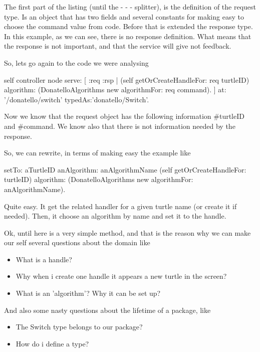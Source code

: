 \documentclass[a4paper,10pt,twoside]{book}
\begin{document}
			The first part of the listing (until the - - - splitter), is the definition of the request type. Is an object that has two fields and several constants for making easy to choose the command value from code. 
			Before that is extended the response type. In this example, as we can see, there is no response definition. What means that the response is not important, and that the service will give not feedback.
			
			So, lets go again to the code we were analysing
			
			
			\begin{code}
	self controller node serve: [ :req :rsp | 
		(self getOrCreateHandleFor: req turtleID)  algorithm: (DonatelloAlgorithms new algorithmFor: req command).		
	] at: '/donatello/switch' typedAs:'donatello/Switch'.

			\end{code}	
			
			Now we know that the request object has the following information \#turtleID and \#command. We know also that there is not information needed by the response. 
			
			So, we can rewrite, in terms of making easy the example like 
			
			\begin{code}
setTo: aTurtleID anAlgorithm: anAlgorithmName
	(self getOrCreateHandleFor: turtleID)  algorithm: (DonatelloAlgorithms new algorithmFor: anAlgorithmName).		
	
			\end{code}	
			
			Quite easy. It get the related handler for a given turtle name (or create it if needed). Then, it choose an algorithm by name and set it to the handle. 
			
			Ok, until here is a very simple method, and that is the reason why we can make our self several questions about the domain like
			
			\begin{itemize}	
				\item What is a handle? 
				\item Why when i create one handle it appears a new turtle in the screen?
				\item What is an 'algorithm'? Why it can be set up? 
			\end{itemize}
			
			And also some nasty questions about the lifetime of a package, like
			\begin{itemize}	
				\item The Switch type belongs to our package?
				\item How do i define a type?
			\end{itemize}
			
\end{document}
